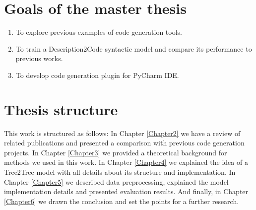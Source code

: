 \section{Goals of the master thesis}

\begin{enumerate}
	\item To explore previous examples of code generation tools.
	\item To train a Description2Code syntactic model and compare its performance to previous works.
	\item To develop code generation plugin for PyCharm IDE.
\end{enumerate}

\section{Thesis structure}
This work is structured as follows: In Chapter \ref{Chapter2} we have a review of related publications and presented a comparison with previous code generation projects. In Chapter \ref{Chapter3} we provided a theoretical background for methods we used in this work. In Chapter \ref{Chapter4} we explained the idea of a Tree2Tree model with all details about its structure and implementation. In Chapter \ref{Chapter5} we described data preprocessing, explained the model implementation details and presented evaluation results. And finally, in Chapter \ref{Chapter6} we drawn the conclusion and set the points for a further research.